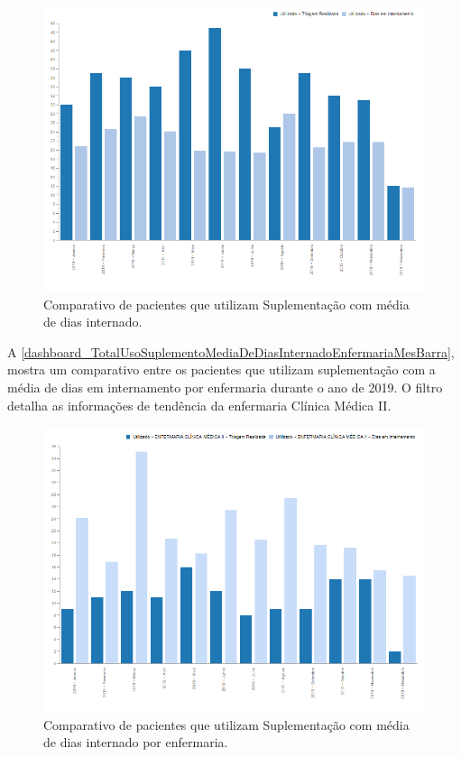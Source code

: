 \begin{figure}[htb]
	\caption{\label{dashboard_TotalUsoSuplementoMediaDeDiasInternadoHospitalMesBarra}Comparativo de pacientes que utilizam Suplementação com média de dias internado.}
	\begin{center}
	    \includegraphics[scale=0.35]{Imagens/6.1.TotalUsoSuplementoMediaDeDiasInternadoHospitalMesBarra.png}
	\end{center}
\end{figure}

A \autoref{dashboard_TotalUsoSuplementoMediaDeDiasInternadoEnfermariaMesBarra}, mostra um comparativo entre os pacientes que utilizam suplementação com a média de dias em internamento por enfermaria durante o ano de 2019. O filtro detalha as informações de tendência da enfermaria Clínica Médica II.

\begin{figure}[htb]
	\caption{\label{dashboard_TotalUsoSuplementoMediaDeDiasInternadoEnfermariaMesBarra}Comparativo de pacientes que utilizam Suplementação com média de dias internado por
enfermaria.}
	\begin{center}
	    \includegraphics[scale=0.35]{Imagens/6.2.TotalUsoSuplementoMediaDeDiasInternadoEnfermariaMesBarra.png}
	\end{center}
\end{figure}

